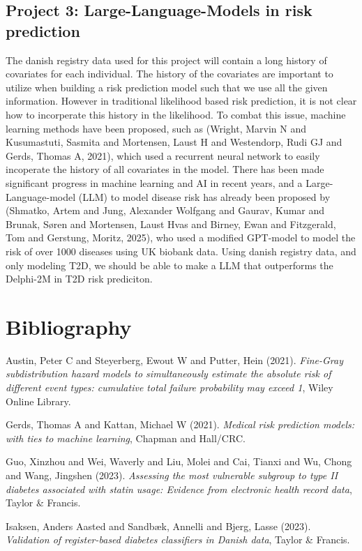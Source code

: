 \documentclass[11pt]{article}
\begin{document}
\subsection{Project 3: Large-Language-Models in risk prediction}
\label{sec:orgc33007e}
The danish registry data used for this project will contain a long history of covariates for each individual. The history of the covariates are important to utilize when building a risk prediction model such that we use all the given information. However in traditional likelihood based risk prediction, it is not clear how to incorperate this history in the likelihood. To combat this issue, machine learning methods have been proposed, such as (Wright, Marvin N and Kusumastuti, Sasmita and Mortensen, Laust H and Westendorp, Rudi GJ and Gerds, Thomas A, 2021), which used a recurrent neural network to easily incoperate the history of all covariates in the model. There has been made significant progress in machine learning and AI in recent years, and a Large-Language-model (LLM) to model disease risk has already been proposed by (Shmatko, Artem and Jung, Alexander Wolfgang and Gaurav, Kumar and Brunak, S{\o}ren and Mortensen, Laust Hvas and Birney, Ewan and Fitzgerald, Tom and Gerstung, Moritz, 2025), who used a modified GPT-model to model the risk of over 1000 diseases using UK biobank data. Using danish registry data, and only modeling T2D, we should be able to make a LLM that outperforms the Delphi-2M in T2D risk prediciton.



\newpage
\section{Bibliography}
\label{sec:orgb3fb39a}
\noindent
Austin, Peter C and Steyerberg, Ewout W and Putter, Hein (2021). \emph{Fine-Gray subdistribution hazard models to simultaneously estimate the absolute risk of different event types: cumulative total failure probability may exceed 1}, Wiley Online Library.

\noindent
Gerds, Thomas A and Kattan, Michael W (2021). \emph{Medical risk prediction models: with ties to machine learning}, Chapman and Hall/CRC.

\noindent
Guo, Xinzhou and Wei, Waverly and Liu, Molei and Cai, Tianxi and Wu, Chong and Wang, Jingshen (2023). \emph{Assessing the most vulnerable subgroup to type II diabetes associated with statin usage: Evidence from electronic health record data}, Taylor \& Francis.

\noindent
Isaksen, Anders Aasted and Sandb{\ae}k, Annelli and Bjerg, Lasse (2023). \emph{Validation of register-based diabetes classifiers in Danish data}, Taylor \& Francis.
\end{document}
